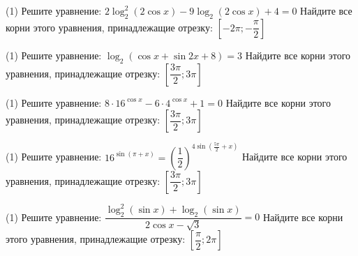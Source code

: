 \begin{homework}[number=1]
	\begin{listofex}
		\item %
		\begin{tasks}(1)
			\task Решите уравнение: \( 2\log_2^2 (2\cos x) - 9 \log_2 (2\cos x) +4 = 0 \)
			\task Найдите все корни этого уравнения, принадлежащие отрезку: \( \left[ -2\pi; -\dfrac{\pi}{2} \right] \)
		\end{tasks}
		\item %
		\begin{tasks}(1)
			\task Решите уравнение: \( \log_2 (\cos x + \sin{2x} + 8) = 3 \)
			\task Найдите все корни этого уравнения, принадлежащие отрезку: \( \left[ \dfrac{3\pi}{2}; 3\pi \right] \)
		\end{tasks}
		\item %
		\begin{tasks}(1) 
			\task Решите уравнение: \( 8 \cdot 16^{\cos x} - 6 \cdot 4^{\cos x} + 1 = 0 \)
			\task Найдите все корни этого уравнения, принадлежащие отрезку: \( \left[ \dfrac{3\pi}{2}; 3 \pi \right] \)
		\end{tasks}
		\item %
		\begin{tasks}(1)
			\task Решите уравнение: \( 16^{\sin (\pi+x)}= \left( \dfrac{1}{2} \right)^{4\sin{(\frac{5\pi}{2}+x)}} \)
			\task Найдите все корни этого уравнения, принадлежащие отрезку: \( \left[ \dfrac{3\pi}{2}; 3\pi \right] \)
		\end{tasks}
		\item %
		\begin{tasks}(1)
			\task Решите уравнение: \( \dfrac{\log^2_2 (\sin x) + \log_2 (\sin{x})}{2\cos x - \sqrt{3}} = 0 \)
			\task Найдите все корни этого уравнения, принадлежащие отрезку: \( \left[ \dfrac{\pi}{2}; 2\pi \right] \)
		\end{tasks}
	\end{listofex}
\end{homework}

